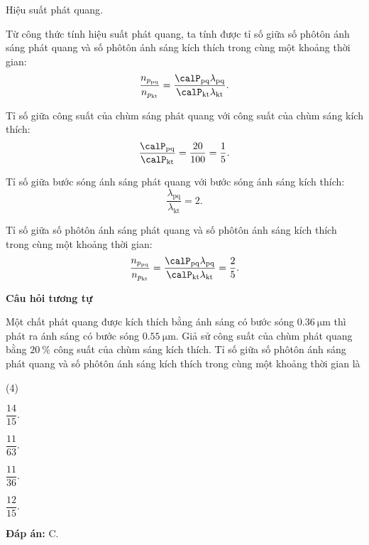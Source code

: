 \begin{dang}{Hiệu suất phát quang.}
{		Từ công thức tính hiệu suất phát quang, ta tính được tỉ số giữa số phôtôn ánh sáng phát quang và số phôtôn ánh sáng kích thích trong cùng một khoảng thời gian:
		\begin{equation*}
			\dfrac{n_{p_\text{pq}}} {n_{p_\text{kt}}} = \dfrac {\calP_\text{pq}\lambda_\text{pq}}{\calP_\text{kt}\lambda_\text{kt}}.
		\end{equation*}
		
		Tỉ số giữa công suất của chùm sáng phát quang với công suất của chùm sáng kích thích:
		\begin{equation*}
			\dfrac{\calP_\text{pq}}{\calP_\text{kt}}=\dfrac{20}{100}=\dfrac{1}{5}.
		\end{equation*}
		
		Tỉ số giữa bước sóng ánh sáng phát quang với bước sóng ánh sáng kích thích:
		\begin{equation*}
			\dfrac{\lambda_\text{pq}}{\lambda_\text{kt}}=2.
		\end{equation*}
		
		Tỉ số giữa số phôtôn ánh sáng phát quang và số phôtôn ánh sáng kích thích trong cùng một khoảng thời gian: \begin{equation*}
			\dfrac{n_{p_\text{pq}}} {n_{p_\text{kt}}} = \dfrac {\calP_\text{pq}\lambda_\text{pq}}{\calP_\text{kt}\lambda_\text{kt}}=\dfrac{2}{5}.
		\end{equation*}
		
		\begin{center}
			\textbf{Câu hỏi tương tự}
		\end{center}
		Một chất phát quang được kích thích bằng ánh sáng có bước sóng $\SI{0.36}{\micro \meter}$ thì phát ra ánh sáng có bước sóng $\SI{0.55}{\micro \meter}$. Giả sử công suất của chùm phát quang bằng $\SI{20}{\percent}$ công suất của chùm sáng kích thích. Tỉ số giữa số phôtôn ánh sáng phát quang và số phôtôn ánh sáng kích thích trong cùng một khoảng thời gian là
		\begin{mcq}(4)
			\item $\dfrac{14}{15}$.
			\item $\dfrac{11}{63}$.
			\item $\dfrac{11}{36}$.
			\item $\dfrac{12}{15}$.
		\end{mcq}
		\textbf{Đáp án:} C.
	}
	

\end{dang}
